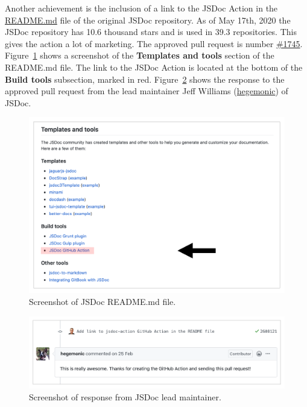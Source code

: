 Another achievement is the inclusion of a link to the JSDoc Action in the \href{https://github.com/jsdoc/jsdoc/blob/master/README.md}{README.md} file of the original JSDoc repository. As of May 17th, 2020 the JSDoc repository has 10.6 thousand stars and is used in 39.3 repositories. This gives the action a lot of marketing. The approved pull request is number \href{https://github.com/jsdoc/jsdoc/pull/1745}{\#1745}. 
Figure~\ref{fig:jsdoc-link-readme} shows a screenshot of the \textbf{Templates and tools} section of the README.md file. The link to the JSDoc Action is located at the bottom of the \textbf{Build tools} subsection, marked in red.
Figure~\ref{fig:comment-hegemonic} shows the response to the approved pull request from the lead maintainer Jeff Williams (\href{https://github.com/hegemonic}{hegemonic}) of JSDoc.
\begin{figure}[htp]
    \centering
    \includegraphics[width=\textwidth]{sections/result/figures/jsdoc-readme.png}
    \caption{Screenshot of JSDoc README.md file.}
    \label{fig:jsdoc-link-readme}
\end{figure}
\begin{figure}[htp]
    \centering
    \includegraphics[width=\textwidth]{sections/result/figures/jsdoc-action-pull-request-approval-jsdoc.png}
    \caption{Screenshot of response from JSDoc lead maintainer.}
    \label{fig:comment-hegemonic}
\end{figure}
